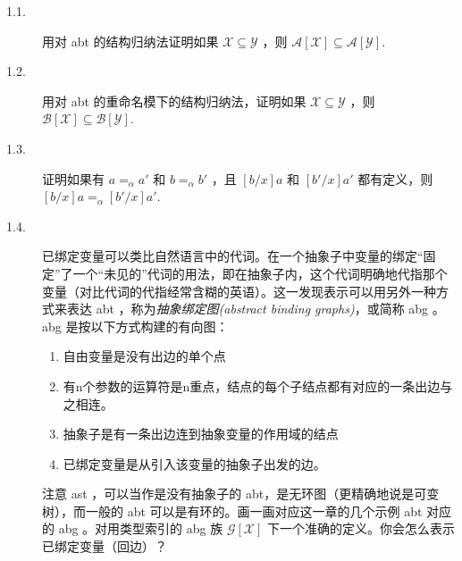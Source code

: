 \begin{description}
\item[1.1.] 用对 abt 的结构归纳法证明如果 \(\mathcal{X} \subseteq \mathcal{Y}\)
，则 \(\mathcal{A[X]} \subseteq \mathcal{A[Y]}\).

\item[1.2.] 用对 abt 的重命名模下的结构归纳法，证明如果
\(\mathcal{X} \subseteq \mathcal{Y}\) ，则
\(\mathcal{B[X]} \subseteq \mathcal{B[Y]}\).

\item[1.3.] 证明如果有 \(a=_\alpha a'\) 和 \(b=_\alpha b'\) ，且 \([b/x]a\) 和
\([b'/x]a'\) 都有定义，则 \([b/x]a=_\alpha [b'/x]a'\).

\item[1.4.]
已绑定变量可以类比自然语言中的代词。在一个抽象子中变量的绑定``固定''了一个``未见的''代词的用法，即在抽象子内，这个代词明确地代指那个变量（对比代词的代指经常含糊的英语）。这一发现表示可以用另外一种方式来表达
abt ，称为\emph{抽象绑定图(abstract binding graphs)}，或简称 abg 。 abg
是按以下方式构建的有向图：

\begin{enumerate}
\def\labelenumi{\arabic{enumi}.}
\item
  自由变量是没有出边的单个点
\item
  有n个参数的运算符是n重点，结点的每个子结点都有对应的一条出边与之相连。
\item
  抽象子是有一条出边连到抽象变量的作用域的结点
\item
  已绑定变量是从引入该变量的抽象子出发的边。
\end{enumerate}

注意 ast ，可以当作是没有抽象子的
abt，是无环图（更精确地说是可变树），而一般的 abt
可以是有环的。画一画对应这一章的几个示例 abt 对应的 abg 。对用类型索引的
abg 族 \(\mathcal{G[X]}\)
下一个准确的定义。你会怎么表示已绑定变量（回边）？
\end{description}